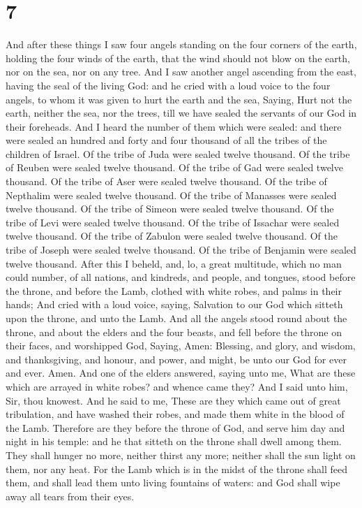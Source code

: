 \hypertarget{section-6}{%
\section{7}\label{section-6}}

 And after these things I saw four angels standing on the
four corners of the earth, holding the four winds of the earth, that the
wind should not blow on the earth, nor on the sea, nor on any tree.
 And I saw another angel ascending from the east, having the
seal of the living God: and he cried with a loud voice to the four
angels, to whom it was given to hurt the earth and the sea, 
Saying, Hurt not the earth, neither the sea, nor the trees, till we have
sealed the servants of our God in their foreheads.  And I
heard the number of them which were sealed: and there were sealed an
hundred and forty and four thousand of all the tribes of the children of
Israel.  Of the tribe of Juda were sealed twelve thousand.
Of the tribe of Reuben were sealed twelve thousand. Of the tribe of Gad
were sealed twelve thousand.  Of the tribe of Aser were
sealed twelve thousand. Of the tribe of Nepthalim were sealed twelve
thousand. Of the tribe of Manasses were sealed twelve thousand.
 Of the tribe of Simeon were sealed twelve thousand. Of the
tribe of Levi were sealed twelve thousand. Of the tribe of Issachar were
sealed twelve thousand.  Of the tribe of Zabulon were sealed
twelve thousand. Of the tribe of Joseph were sealed twelve thousand. Of
the tribe of Benjamin were sealed twelve thousand.  After
this I beheld, and, lo, a great multitude, which no man could number, of
all nations, and kindreds, and people, and tongues, stood before the
throne, and before the Lamb, clothed with white robes, and palms in
their hands;  And cried with a loud voice, saying,
Salvation to our God which sitteth upon the throne, and unto the Lamb.
 And all the angels stood round about the throne, and about
the elders and the four beasts, and fell before the throne on their
faces, and worshipped God,  Saying, Amen: Blessing, and
glory, and wisdom, and thanksgiving, and honour, and power, and might,
be unto our God for ever and ever. Amen.  And one of the
elders answered, saying unto me, What are these which are arrayed in
white robes? and whence came they?  And I said unto him,
Sir, thou knowest. And he said to me, These are they which came out of
great tribulation, and have washed their robes, and made them white in
the blood of the Lamb.  Therefore are they before the
throne of God, and serve him day and night in his temple: and he that
sitteth on the throne shall dwell among them.  They shall
hunger no more, neither thirst any more; neither shall the sun light on
them, nor any heat.  For the Lamb which is in the midst of
the throne shall feed them, and shall lead them unto living fountains of
waters: and God shall wipe away all tears from their eyes.

